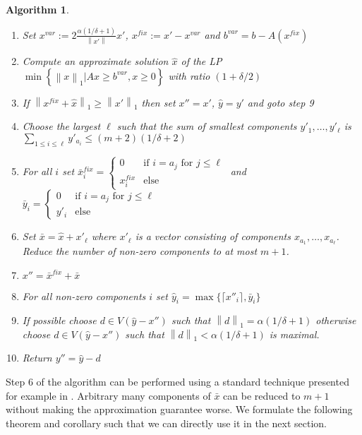 \documentclass[a4paper,11pt]{article}
\newcommand{\mengest}[2]{\left\{#1|#2\right\}}
\newcommand{\nor}[1]{\left\|#1\right\|}
\newtheorem{algo}{Algorithm}
\begin{document}
\begin{algo}\label{alg5}
\ 
  \begin{enumerate}
   \item Set $x^{var} := 2 \frac{ \alpha(1 / \delta +1)}{\nor{x'}}x'$, $x^{fix} := x' - x^{var}$ and 
   $b^{var} = b - A(x^{fix})$
	\item Compute an approximate solution $\hat{x}$ of the LP $\min \mengest{\nor{x}_1}{Ax \geq b^{var}, x\geq 0 }$
	with ratio $(1+ \delta/2)$
	\item If $\nor{x^{fix} + \hat{x}}_1 \geq \nor{x'}_1$ then set $x'' = x'$, 
	$\hat{y} = y'$ and goto step 9
  \item Choose the largest $\ell$ such that the sum of smallest components $y'_1, \ldots , y'_{\ell}$ is 
  $\sum_{1\leq i \leq \ell} y'_{a_i} \leq (m+2)(1/ \delta +2)$
	\item For all $i $ set $\bar{x}^{fix}_{i} = 
	\begin{cases} 0 & \text{if }i= a_j \text{ for } j \leq \ell \\
	x^{fix}_i & \text{else}
	\end{cases}$ 
	and $\bar{y}_i = \begin{cases} 0 & \text{if }i= a_j \text{ for } j \leq \ell \\
	y'_i & \text{else}
	\end{cases}$
	\item Set $\bar{x} = \hat{x} + x'_{\ell}$ where $x'_{\ell}$ is a vector consisting of components 
	$x_{a_1}, \ldots ,x_{a_{\ell}}$. Reduce the number of non-zero components to at most $m+1$.
  \item $x'' = \bar{x}^{fix} + \bar{x}$
  \item For all non-zero components $i$ set $\hat{y}_i = \max \{\lceil x''_i \rceil , \bar{y}_i \}$
	\item If possible choose $d \in V(\hat{y}-x'')$ such that $\nor{d}_1 = \alpha (1/ \delta +1)$ otherwise
  choose $d \in V(\hat{y}-x'')$ such that $\nor{d}_1 < \alpha (1/ \delta +1)$ is maximal.
  \item Return $y'' = \hat{y} -d$
  \end{enumerate}
\end{algo}
Step 6 of the algorithm can be performed using a standard technique presented for example in \cite{beling1998}. 
Arbitrary many components of 
$\bar{x}$ can be reduced to $m+1$ without making the approximation guarantee worse.
We formulate the following theorem and corollary such that we can directly use it in the next section.
\end{document}

